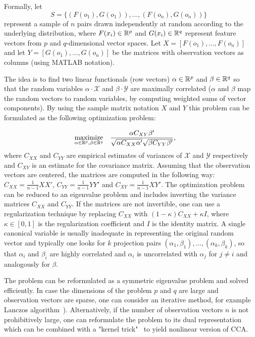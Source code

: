 Formally, let
$$ S = \{ \left( F(o_1), G(o_1) \right), \ldots, \left( F(o_n), G(o_n) \right) \} $$
represent a sample of $n$ pairs drawn independently at random according to the underlying distribution, where $F(x_i) \in \mathbb{R}^p$ and $G(x_i) \in \mathbb{R}^q$ represent feature vectors from $p$ and $q$-dimensional vector spaces. Let $X=[F(o_1), \ldots, F(o_n)]$ and let $Y=[G(o_1), \ldots ,G(o_n)]$ be the matrices with observation vectors as columns (using MATLAB notation).

The idea is to find two linear functionals (row vectors) $\alpha \in \mathbb{R}^p$ and $\beta \in \mathbb{R}^q$ so that the random variables $\alpha \cdot \mathcal{X}$ and $\beta \cdot \mathcal{Y}$ are maximally correlated ($\alpha$ and $\beta$ map the random vectors to random variables, by computing weighted sums of vector components). By using the sample matrix notation $X$ and $Y$ this problem can be formulated as the following optimization problem:

\begin{equation*}
\begin{aligned}
& \underset{\alpha \in \mathbb{R}^{p}, \beta \in \mathbb{R}^{q}}{\text{maximize}}
& & \frac{\alpha C_{XY} \beta'}{\sqrt{\alpha C_{XX} \alpha'} \sqrt{\beta C_{YY} \beta'}},
\end{aligned}
\end{equation*}
where $C_{XX}$ and $C_{YY}$ are empirical estimates of variances of $\mathcal{X}$ and $\mathcal{Y}$ respectively and $C_{XY}$ is an estimate for the covariance matrix. Assuming that the observation vectors are centered, the matrices are computed in the following way: $C_{XX} = \frac{1}{n-1}X X'$, $C_{YY} = \frac{1}{n-1}Y Y'$ and $C_{XY} = \frac{1}{n-1}X Y'$.
The optimization problem can be reduced to an eigenvalue problem and includes inverting the variance matrices $C_{XX}$ and $C_{YY}$. If the matrices are not invertible, one can use a regularization technique by replacing $C_{XX}$ with $(1- \kappa)C_{XX} + \kappa I$, where $\kappa \in [0,1]$ is the regularization coefficient and $I$ is the identity matrix.
A single canonical variable is usually inadequate in representing the original random vector and typically one looks for $k$ projection pairs $(\alpha_1, \beta_1),\ldots,(\alpha_k, \beta_k)$, so that $\alpha_i$ and $\beta_i$ are highly correlated and $\alpha_i$ is uncorrelated with $\alpha_j$  for $j \neq i$ and analogously for $\beta$.

The problem can be reformulated as a symmetric eigenvalue problem and solved efficiently. In case the dimensions of the problem $p$ and $q$ are large and observation vectors are sparse, one can consider an iterative method, for example Lanczos algorithm~\cite{LAL}). Alternatively, if the number of observation vectors $n$ is not prohibitively large, one can reformulate the problem to its dual representation which can be combined with a "kernel trick"~\cite{FBMJ} to yield nonlinear version of CCA.

